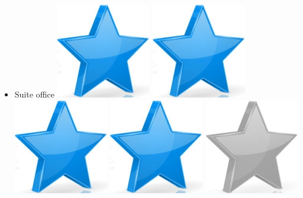 \documentclass[10pt,a4paper,sans]{article}
\begin{document}
\begin{minipage}[t]{0.28\textwidth}
\begin{mdframed}[style=cadreCompetences]
\begin{itemize}
                \item{Suite office
                    \hfill
                    \includegraphics[scale=0.25]{img/star.png} \hspace{-0.22cm}
                    \includegraphics[scale=0.25]{img/star.png} \hspace{-0.22cm}
                    \includegraphics[scale=0.25]{img/star.png} \hspace{-0.22cm}
                    \includegraphics[scale=0.25]{img/star.png} \hspace{-0.22cm}
                    \includegraphics[scale=0.25]{img/empty_star.png}}

\end{itemize}
\end{mdframed}
\end{minipage}
\end{document}
